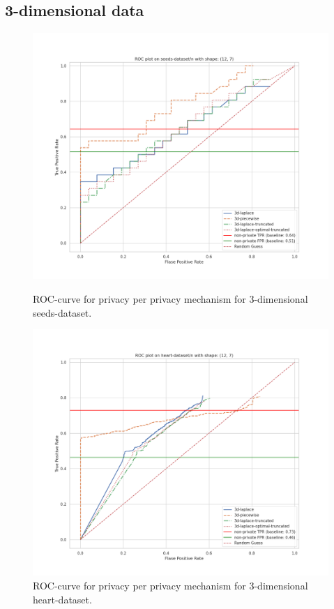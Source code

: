 
\newpage

\newpage
\subsection{3-dimensional data}
\begin{figure}[H]
    \centering
    \begin{minipage}[c]{0.49\textwidth}
        \includegraphics[width=1\textwidth]{Results/RQ2/seeds-dataset/roc_plot.png}
        \caption{ROC-curve for privacy per privacy mechanism for 3-dimensional seeds-dataset.}
        \label{fig:privacy_seeds-dataset_comparison_3d_roc_plot}
    \end{minipage}
    \begin{minipage}[c]{0.49\textwidth}
        \includegraphics[width=1\textwidth]{Results/RQ2/heart-dataset/roc_plot.png}
        \caption{ROC-curve for privacy per privacy mechanism for 3-dimensional heart-dataset.}
        \label{fig:privacy_heart-dataset_comparison_3d_roc_plot}
    \end{minipage}
\end{figure}
